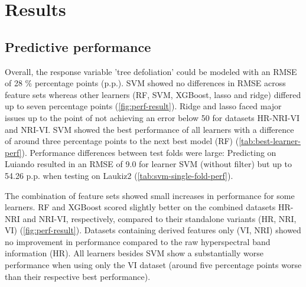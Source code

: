 \documentclass[letterpaper, peerreview]{IEEEtran}
\begin{document}
\section{Results}

\subsection{Predictive performance}

\noindent Overall, the response variable 'tree defoliation' could be modeled with an \ac{RMSE} of 28 \% percentage points (p.p.).
SVM showed no differences in RMSE across feature sets whereas other learners (RF, SVM, XGBoost, lasso and ridge) differed up to seven percentage points (\autoref{fig:perf-result}).
Ridge and lasso faced major issues up to the point of not achieving an error below 50 for datasets HR-NRI-VI and NRI-VI.
SVM showed the best performance of all learners with a difference of around three percentage points to the next best model (RF) (\autoref{tab:best-learner-perf}).
Performance differences between test folds were large: Predicting on Luiando resulted in an RMSE of 9.0 for learner SVM (without filter) but up to 54.26 p.p. when testing on Laukiz2 (\autoref{tab:svm-single-fold-perf}).

The combination of feature sets showed small increases in performance for some learners.
RF and XGBoost scored slightly better on the combined datasets HR-NRI and NRI-VI, respectively, compared to their standalone variants (HR, NRI, VI) (\autoref{fig:perf-result}).
Datasets containing derived features only (VI, NRI) showed no improvement in performance compared to the raw hyperspectral band information (HR).
All learners besides SVM show a substantially worse performance when using only the VI dataset (around five percentage points worse than their respective best performance).
\end{document}
